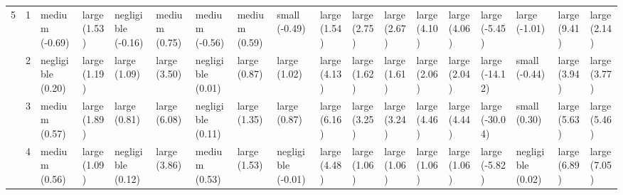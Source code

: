 \begin{tabular}{llllllllllllllllll}
5 & 1 &      medium (-0.69) &   large (1.53) &  negligible (-0.16) &  medium (0.75) &      medium (-0.56) &       medium (0.59) &       small (-0.49) &  large (1.54) &  large (2.75) &  large (2.67) &   large (4.10) &   large (4.06) &   large (-5.45) &       large (-1.01) &  large (9.41) &  large (2.14) \\
  & 2 &   negligible (0.20) &   large (1.19) &        large (1.09) &   large (3.50) &   negligible (0.01) &        large (0.87) &        large (1.02) &  large (4.13) &  large (1.62) &  large (1.61) &   large (2.06) &   large (2.04) &  large (-14.12) &       small (-0.44) &  large (3.94) &  large (3.77) \\
  & 3 &       medium (0.57) &   large (1.89) &        large (0.81) &   large (6.08) &   negligible (0.11) &        large (1.35) &        large (0.87) &  large (6.16) &  large (3.25) &  large (3.24) &   large (4.46) &   large (4.44) &  large (-30.04) &        small (0.30) &  large (5.63) &  large (5.46) \\
  & 4 &       medium (0.56) &   large (1.09) &   negligible (0.12) &   large (3.86) &       medium (0.53) &        large (1.53) &  negligible (-0.01) &  large (4.48) &  large (1.06) &  large (1.06) &   large (1.06) &   large (1.06) &   large (-5.82) &   negligible (0.02) &  large (6.89) &  large (7.05) \\
\bottomrule
\end{tabular}

